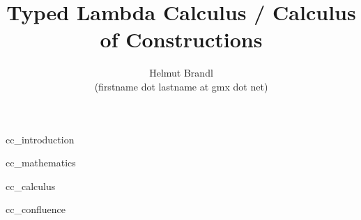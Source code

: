 \documentclass[12pt]{article}
\begin{document}


\title{Typed Lambda Calculus / Calculus of Constructions}
\author{Helmut Brandl \\ \scriptsize (firstname dot lastname at gmx dot net)}
\date{}

\maketitle





\tableofcontents

 {cc_introduction}

 {cc_mathematics}

 {cc_calculus}

 {cc_confluence}






\end{document}
